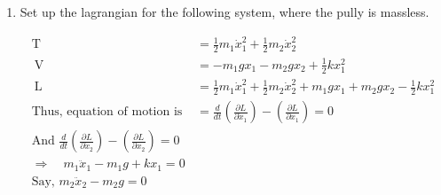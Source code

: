 \begin{enumerate}
\begin{answer}
\begin{align*}
\intertext{	Hence the Lagrangian for the system is}
\mathrm{L}&=\mathrm{T}-\mathrm{V} \\
\mathrm{L}&=\frac{1}{2} m a^{2} \dot{\theta}^{2}+\frac{1}{2} m\left(\frac{a^{2}}{4} \dot{\theta}^{2}+a \dot{\theta} \dot{x}_{2}+\dot{x}_{2}^{2}\right)-\frac{1}{2} k x_{1}^{2}-\frac{1}{2} k x_{2}^{2}+m g\left(\frac{a}{2} \theta+x_{2}\right)\\
\text{Lagrangian eq. of motion, }&\frac{d}{d t}\left(\frac{\partial L}{\partial \dot{x}_{2}}\right)-\left(\frac{\partial L}{\partial x_{2}}\right)=0 \Rightarrow \frac{d}{d t}\left(\frac{\partial L}{\partial \dot{\theta}}\right)-\left(\frac{\partial L}{\partial \theta}\right)\\
\text { Or } \quad \frac{d}{d t}\left[\frac{1}{2} m a \theta+m \dot{x}_{2}\right]&-\left[-k x_{2}+m g\right]=0  \Rightarrow m \ddot{x}_{2}+k x_{2}+\frac{1}{2} m(a \ddot{\theta}-2 g)=0 \\ 
\text { Or } \quad \ddot{x}+\left(\frac{k}{m}\right) x_{2}&+\frac{1}{2}(a \ddot{\theta}-2 g)=0 \quad  \Rightarrow \frac{d}{d t}\left[\frac{1}{2} m a^{2} \dot{\theta}+\frac{1}{2} m a^{2}+\dot{\theta} \max _{2}\right]-\left[-k a^{2} \theta+\frac{m g a}{2}\right]\\
\text{Or }\quad \frac{3}{4} m a^{2} \ddot{\theta}&+R a^{2} \theta+\frac{1}{2} m a\left(\ddot{x}_{2}-g\right)=0\\
\text{Or }\quad \ddot{\theta}&+\left(\frac{4}{3} \frac{k}{m}\right) \theta+\frac{2}{3 a}\left(\ddot{x}_{2}-g\right)=0
\intertext{Which are the required equation of motion.}
	\end{align*}
\end{answer}
\item Set up the lagrangian for the following system, where the pully is massless.
\begin{answer}
	\begin{align*}
	\mathrm{T}&=\frac{1}{2} m_{1} \dot{x}_{1}^{2}+\frac{1}{2} m_{2} \dot{x}_{2}^{2}\\
	\mathrm{~V}&=-m_{1} g x_{1}-m_{2} g x_{2}+\frac{1}{2} k x_{1}^{2}\\
	\mathrm{~L}&=\frac{1}{2} m_{1} \dot{x}_{1}^{2}+\frac{1}{2} m_{2} \dot{x}_{2}^{2}+m_{1} g x_{1}+m_{2} g x_{2}-\frac{1}{2} k x_{1}^{2}\\
	\text{Thus, equation of motion is }&=\frac{d}{d t}\left(\frac{\partial L}{\partial \dot{x}_{1}}\right)-\left(\frac{\partial L}{\partial x_{1}}\right)=0\\
	\text{And }\frac{d}{d t}\left(\frac{\partial L}{\partial \dot{x}_{2}}\right)-\left(\frac{\partial L}{\partial x_{2}}\right)=0\\
	\Rightarrow \quad m_{1} \ddot{x}_{1}-m_{1} g+k x_{1}=0\\
	\text{Say, }m_{2} \ddot{x}_{2}-m_{2} g=0
	\end{align*}
\end{answer}














\end{enumerate}